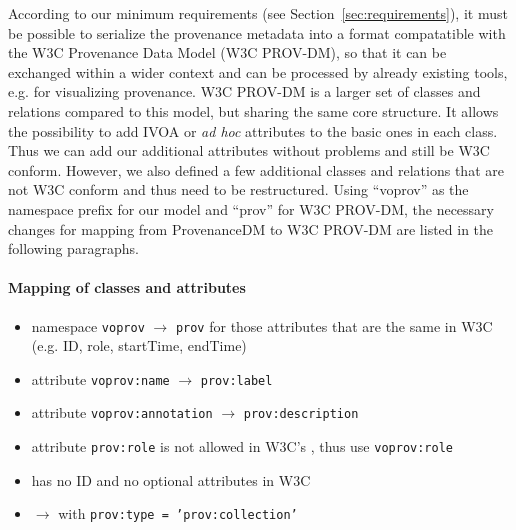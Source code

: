 According to our minimum requirements (see Section~\ref{sec:requirements}), it must be possible to
serialize the provenance metadata into a format compatatible with the W3C Provenance Data Model (W3C PROV-DM), so that it can be exchanged within a wider context and can be processed by already existing tools, e.g. for visualizing provenance.
W3C PROV-DM is a larger set of classes and relations compared to this model, but sharing the same core structure. It allows the possibility to add IVOA or \textit{ad hoc} attributes to the basic ones in each class. Thus we can add our additional attributes without problems and still be W3C conform. However, we also defined a few additional classes and relations that are not W3C conform and thus need to be restructured.
Using ``voprov'' as the namespace prefix for our model and ``prov'' for W3C PROV-DM, the necessary changes for mapping from ProvenanceDM to W3C PROV-DM are listed in the following paragraphs.

\paragraph{Mapping of classes and attributes}
\begin{itemize}
\item namespace \texttt{voprov} $\rightarrow$ \texttt{prov} for those attributes that are the same in W3C (e.g. ID, role, startTime, endTime)
\item attribute \texttt{voprov:name} $\rightarrow$ \texttt{prov:label}
\item attribute \texttt{voprov:annotation} $\rightarrow$ \texttt{prov:description}
\item attribute \texttt{prov:role} is not allowed in W3C's , thus use \texttt{voprov:role}
\item {} has no ID and no optional attributes in W3C
\item {} $\rightarrow$  with \texttt{prov:type = 'prov:collection'}
\end{itemize}

